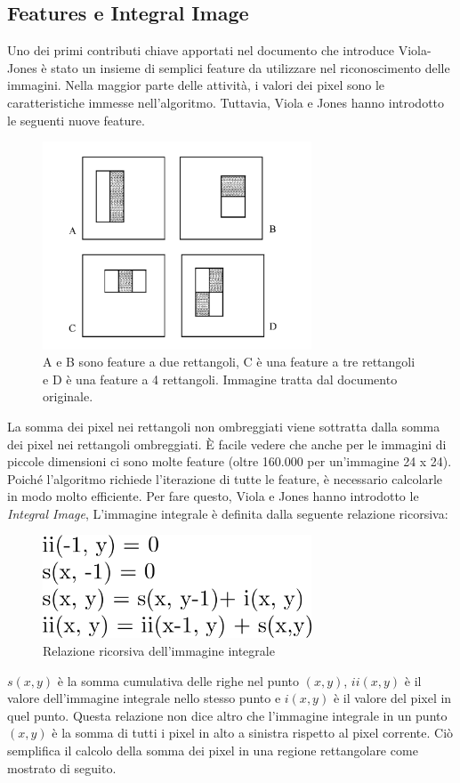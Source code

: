 \subsection{Features e Integral Image}
Uno dei primi contributi chiave apportati nel documento\cite{violapaper} che introduce Viola-Jones è stato un insieme di semplici feature da utilizzare nel riconoscimento delle immagini. Nella maggior parte delle attività, i valori dei pixel sono le caratteristiche immesse nell'algoritmo. Tuttavia, Viola e Jones hanno introdotto le seguenti nuove feature.

\begin{figure}[h!]
	\centering
	\includegraphics[width=80mm]{img/4/violahaar_1_2}
	\caption{\fontsize{10px}{0mm}\selectfont A e B sono feature a due rettangoli, C è una feature a tre rettangoli e D è una feature a 4 rettangoli. Immagine tratta dal documento originale. \label{fig:violahaar_1_2}}
\end{figure}

La somma dei pixel nei rettangoli non ombreggiati viene sottratta dalla somma dei pixel nei rettangoli ombreggiati. È facile vedere che anche per le immagini di piccole dimensioni ci sono molte feature (oltre 160.000 per un'immagine 24 x 24). Poiché l'algoritmo richiede l'iterazione di tutte le feature, è necessario calcolarle in modo molto efficiente. Per fare questo, Viola e Jones hanno introdotto le \emph{Integral Image}, L'immagine integrale è definita dalla seguente relazione ricorsiva: \newpage

\begin{figure}[h!]
	\centering
	\includegraphics[width=80mm]{img/4/violahaar_1_3}
	\caption{\fontsize{10px}{0mm}\selectfont Relazione ricorsiva dell'immagine integrale \label{fig:violahaar_1_3}}
\end{figure}
$s(x, y)$ è la somma cumulativa delle righe nel punto $(x, y)$, $ii(x, y)$ è il valore dell'immagine integrale nello stesso punto e $i(x, y)$ è il valore del pixel in quel punto. Questa relazione non dice altro che l'immagine integrale in un punto $(x, y)$ è la somma di tutti i pixel in alto a sinistra rispetto al pixel corrente. Ciò semplifica il calcolo della somma dei pixel in una regione rettangolare come mostrato di seguito.


